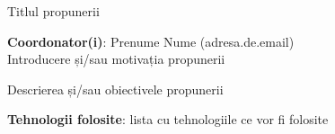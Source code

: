 \documentclass[diploma]{proposal.cs.pub.ro}
\begin{document}
{\Large Titlul propunerii}

\textbf{Coordonator(i)}: Prenume Nume (adresa.de.email)
\\


Introducere și/sau motivația propunerii

Descrierea și/sau obiectivele propunerii

\textbf{Tehnologii folosite}: lista cu tehnologiile ce vor fi folosite

\end{document}
